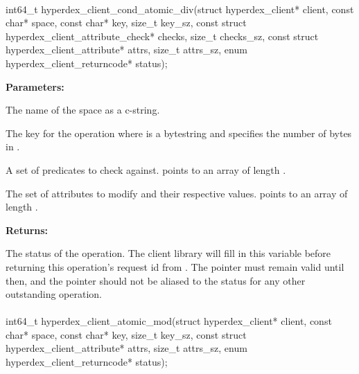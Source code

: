 \paragraph{}
\label{api:c:cond_atomic_div}
\begin{ccode}
int64_t hyperdex_client_cond_atomic_div(struct hyperdex_client* client,
        const char* space,
        const char* key, size_t key_sz,
        const struct hyperdex_client_attribute_check* checks, size_t checks_sz,
        const struct hyperdex_client_attribute* attrs, size_t attrs_sz,
        enum hyperdex_client_returncode* status);
\end{ccode}
\funcdesc 

\noindent\textbf{Parameters:}
\begin{description}[labelindent=\widthof{{\code{checks}, \code{checks\_sz}}},leftmargin=*,noitemsep,nolistsep,align=right]
\item[\code{space}] The name of the space as a c-string.
\item[\code{key}, \code{key\_sz}] The key for the operation where  is a bytestring and  specifies the number of bytes in .
\item[\code{checks}, \code{checks\_sz}] A set of predicates to check against.   points to an array of length .
\item[\code{attrs}, \code{attrs\_sz}] The set of attributes to modify and their respective values.   points to an array of length .
\end{description}

\noindent\textbf{Returns:}
\begin{description}[labelindent=\widthof{{\code{status}}},leftmargin=*,noitemsep,nolistsep,align=right]
\item[\code{status}] The status of the operation.  The client library will fill in this variable before returning this operation's request id from .  The pointer must remain valid until then, and the pointer should not be aliased to the status for any other outstanding operation.
\end{description}

\paragraph{}
\label{api:c:atomic_mod}
\begin{ccode}
int64_t hyperdex_client_atomic_mod(struct hyperdex_client* client,
        const char* space,
        const char* key, size_t key_sz,
        const struct hyperdex_client_attribute* attrs, size_t attrs_sz,
        enum hyperdex_client_returncode* status);
\end{ccode}
\funcdesc 

